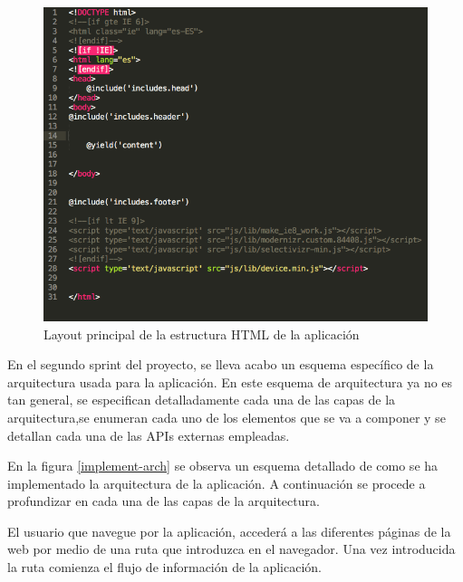 \begin{figure}
\begin{center}
\includegraphics[width=1.0\textwidth]{imagenes/layout.png}
\caption{Layout principal de la estructura HTML de la aplicación}
\label{layout}
\end{center}
\end{figure}

En el segundo sprint del proyecto, se lleva acabo un esquema específico de la arquitectura usada para la aplicación. En este esquema de arquitectura ya no es tan general, se especifican detalladamente cada una de las capas de la arquitectura,se enumeran cada uno de los elementos que se va a componer y se detallan cada una de las APIs externas empleadas.

\vspace{5 mm}

En la figura \ref{implement-arch} se observa un esquema detallado de como se ha implementado la arquitectura de la aplicación. A continuación se procede a profundizar en cada una de las capas de la arquitectura.

\vspace{5 mm}

El usuario que navegue por la aplicación, accederá a las diferentes páginas de la web por medio de una ruta que introduzca en el navegador. Una vez introducida la ruta comienza el flujo de información de la aplicación.

\vspace{5 mm}

